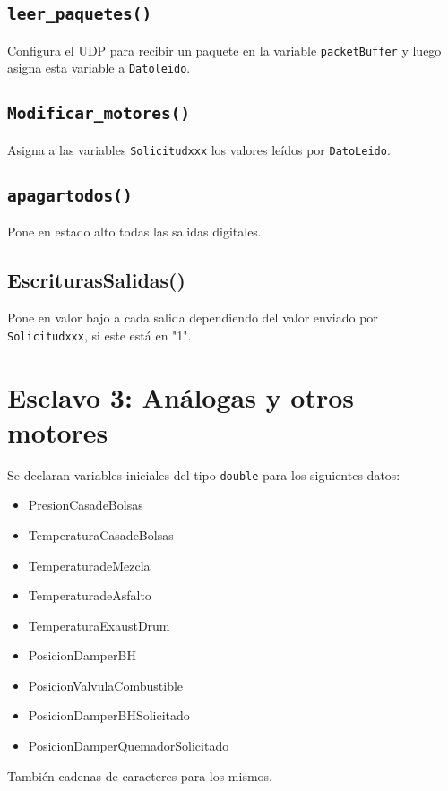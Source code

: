 \subsection{\texttt{leer\_paquetes()}}

Configura el UDP para recibir un paquete en la variable \texttt{packetBuffer} y luego asigna esta variable a \texttt{Datoleido}.

\subsection{\texttt{Modificar\_motores()}}

Asigna a las variables \texttt{Solicitudxxx} los valores leídos por \texttt{DatoLeido}. 

\subsection{\texttt{apagartodos()}}

Pone en estado alto todas las salidas digitales.

\subsection{EscriturasSalidas()}

Pone en valor bajo a cada salida dependiendo del valor enviado por \texttt{Solicitudxxx}, si este está en "1".

\section{Esclavo 3: Análogas y otros motores}

Se declaran variables iniciales del tipo \texttt{double} para los siguientes datos:
\begin{itemize}
    \item PresionCasadeBolsas
    \item TemperaturaCasadeBolsas
    \item TemperaturadeMezcla
    \item TemperaturadeAsfalto
    \item TemperaturaExaustDrum
    \item PosicionDamperBH
    \item PosicionValvulaCombustible
    \item PosicionDamperBHSolicitado
    \item PosicionDamperQuemadorSolicitado
    
\end{itemize}

También cadenas de caracteres para los mismos.